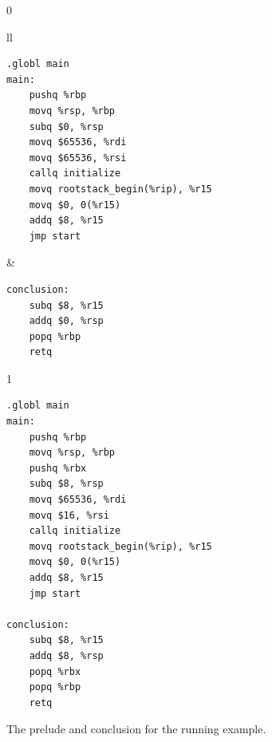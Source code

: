 \documentclass[7x10]{TimesAPriori_MIT}%
\def\racketEd{0}
\def\pythonEd{1}
\providecommand{\BookEdition}{1}
\let\edition\BookEdition
\numberwithin{theorem}{chapter}
\numberwithin{definition}{chapter}
\numberwithin{equation}{chapter}
\begin{document}
\begin{figure}[htbp]
  \begin{tcolorbox}[colback=white]
{\if\edition\racketEd    
\begin{tabular}{ll}
\begin{minipage}[t]{0.45\textwidth}
\begin{lstlisting}[basicstyle=\ttfamily\footnotesize]
	.globl main
main:
    pushq %rbp
    movq %rsp, %rbp
    subq $0, %rsp
    movq $65536, %rdi
    movq $65536, %rsi
    callq initialize
    movq rootstack_begin(%rip), %r15
    movq $0, 0(%r15)
    addq $8, %r15
    jmp start
\end{lstlisting}
\end{minipage}
&
\begin{minipage}[t]{0.45\textwidth}
\begin{lstlisting}[basicstyle=\ttfamily\footnotesize]
conclusion:
    subq $8, %r15
    addq $0, %rsp
    popq %rbp
    retq
\end{lstlisting}
\end{minipage}
\end{tabular}
\fi}
{\if\edition\pythonEd    
\begin{minipage}[t]{0.5\textwidth}
\begin{lstlisting}[basicstyle=\ttfamily\footnotesize]
    .globl main
main:
    pushq %rbp
    movq %rsp, %rbp
    pushq %rbx
    subq $8, %rsp
    movq $65536, %rdi
    movq $16, %rsi
    callq initialize
    movq rootstack_begin(%rip), %r15
    movq $0, 0(%r15)
    addq $8, %r15
    jmp start

conclusion:
    subq $8, %r15
    addq $8, %rsp
    popq %rbx
    popq %rbp
    retq 
\end{lstlisting}
\end{minipage}
\fi}
  \end{tcolorbox}

  \caption{The prelude and conclusion for the running example.}
\label{fig:print-x86-output-gc}
\end{figure}
\end{document}
